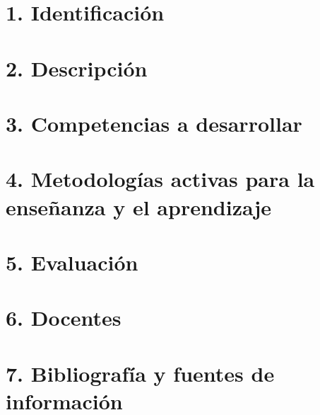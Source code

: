 \documentclass[letter,11pt]{article}
\author{Lynette García, Erick Marroquín}
\begin{document}

    \section*{1. Identificación}
    \identificacion


    \section*{2. Descripción}
    \descripcion
    

    \section*{3. Competencias a desarrollar}
    


    \section*{4. Metodologías activas para la enseñanza y el aprendizaje}
    \metodologias


    \section*{5. Evaluación}
    \reglasEvaluacion
    \newpage
    
    
    \newpage
    \section*{6. Docentes}
    \listaDocentes
    

    \section*{7. Bibliografía y fuentes de información}
    \bibliografia
    
\end{document}

